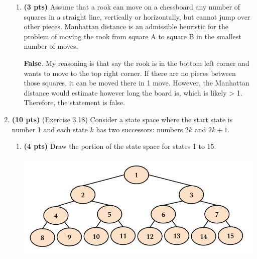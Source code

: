 \documentclass{article}
\begin{document}
\begin{enumerate}
\begin{enumerate}[label=($\alph*$)]

    \item \textbf{(3 pts)} Assume that a rook can move on a chessboard any number of squares in a straight line, vertically or horizontally, but cannot jump over other pieces. Manhattan distance is an admissible heuristic for the problem of moving the rook from square A to square B in the smallest number of moves.

    \color{blue}
        \textbf{False}. My reasoning is that say the rook is in the bottom left corner and wants to move to the top right corner. If there are no pieces between those squares, it can be moved there in 1 move. However, the Manhattan distance would estimate however long the board is, which is likely > 1. Therefore, the statement is false.
    \color{black}

    
    \end{enumerate}



\item \textbf{(10 pts)} (Exercise 3.18) Consider a state space where the start state is number 1 and each state $k$ has two successors: numbers $2k$ and $2k + 1$.

\begin{enumerate}[label=($\alph*$)]
    
    
    \item \textbf{(4 pts)} Draw the portion of the state space for states 1 to 15.

    \color{blue}
        \includegraphics[scale=0.5]{472-PS2-Q2A.png}
    \color{black}


\end{enumerate}
\end{enumerate}
\end{document}

